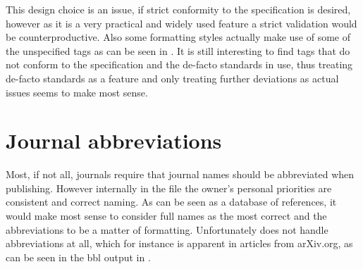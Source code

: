 This design choice is an issue, if strict conformity to the
specification is desired, however as it is a very practical and widely
used feature a strict validation would be counterproductive.  Also
some formatting styles actually make use of some of the unspecified
tags as can be seen in . It is still
interesting to find tags that do not conform to the specification and
the de-facto standards in use, thus treating de-facto standards as a
feature and only treating further deviations as actual issues seems to
make most sense.


\section{Journal abbreviations}
\label{sec:problems_abbreviations}

Most, if not all, journals require that journal names should be
abbreviated when publishing.  However internally in the {\bibtex} file
the owner's personal priorities are consistent and correct naming.  As
{\bibtex} can be seen as a database of references, it would make most
sense to consider full names as the most correct and the abbreviations
to be a matter of formatting.  Unfortunately {\bibtex} does not handle
abbreviations at all, which for instance is apparent in articles from
arXiv.org, as can be seen in the bbl output in
.

